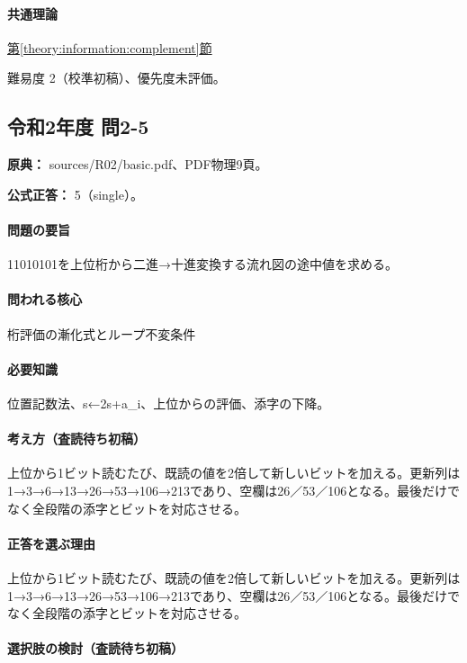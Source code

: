 \paragraph{共通理論} \hyperref[theory:information:complement]{第\ref*{theory:information:complement}節}

\par 難易度 2（校準初稿）、優先度未評価。

\subsection{令和2年度 問2-5}
\label{q:r02-reg-basic-2-5}

\noindent\textbf{原典：} sources/R02/basic.pdf、PDF物理9頁。

\textbf{公式正答：} 5（single）。

\paragraph{問題の要旨} 11010101を上位桁から二進→十進変換する流れ図の途中値を求める。

\paragraph{問われる核心} 桁評価の漸化式とループ不変条件

\paragraph{必要知識} 位置記数法、s←2s+a\_i、上位からの評価、添字の下降。

\paragraph{考え方（査読待ち初稿）} 上位から1ビット読むたび、既読の値を2倍して新しいビットを加える。更新列は1→3→6→13→26→53→106→213であり、空欄は26／53／106となる。最後だけでなく全段階の添字とビットを対応させる。

\paragraph{正答を選ぶ理由} 上位から1ビット読むたび、既読の値を2倍して新しいビットを加える。更新列は1→3→6→13→26→53→106→213であり、空欄は26／53／106となる。最後だけでなく全段階の添字とビットを対応させる。

\paragraph{選択肢の検討（査読待ち初稿）}

